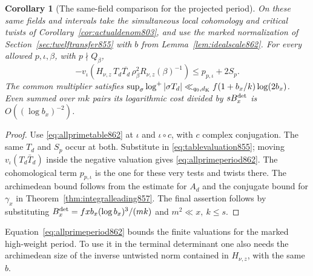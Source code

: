 \documentclass[a4paper,11pt]{article}
\newtheorem{corollary}[proposition]{Corollary}
\theoremstyle{definition}
\theoremstyle{remark}
\numberwithin{equation}{section}
\begin{document}
\begin{corollary}[The same-field comparison for the projected period]
\leavevmode\label{cor:allprimeperiod862}
On these same fields and intervals take the simultaneous local
cohomology and critical twists of Corollary~\ref{cor:actualdenom803},
and use the marked normalization of Section~\ref{sec:twelftransfer855}
with \(b\) from Lemma~\ref{lem:idealscale862}. For every
allowed \(p,\iota,\beta\), with \(p\nmid Q_\beta\),
\begin{equation}
  -v_\iota\!\left(H_{\nu,z}\,T_d\overline{T_d}\,
                    \rho_\beta^2 R_{\nu,z}(\beta)^{-1}\right)
                          \le p_{p,\iota}+2S_p .
 \label{eq:allprimeperiod862}
\end{equation}
The common multiplier satisfies
\(\sup_\sigma\log^+|\sigma T_d|
            \ll_{q_0,d_{\rm K}} f(1+b_x/k)\log(2b_x)\).
Even summed over \(mk\) pairs its logarithmic cost divided by
\(sB_x^{\rm det}\) is \(O((\log b_x)^{-2})\).
\end{corollary}
\begin{proof}
Use \eqref{eq:allprimetable862} at \(\iota\) and
\(\iota\circ c\), with \(c\) complex conjugation. The same
\(T_d\) and \(S_p\) occur at both. Substitute in
\eqref{eq:tablevaluation855}; moving \(v_\iota(T_d\bar T_d)\)
inside the negative valuation gives \eqref{eq:allprimeperiod862}.
The cohomological term \(p_{p,\iota}\) is the one for these
very tests and twists there. The archimedean bound follows
from the estimate for \(A_d\) and the conjugate bound for
\(\gamma_x\) in Theorem~\ref{thm:integralleading857}.
The final assertion follows by substituting
\(B_x^{\rm det}=fxb_x(\log b_x)^3/(mk)\) and
\(m^2\ll x,\ k\le s\).
\end{proof}

Equation~\eqref{eq:allprimeperiod862} bounds the finite valuations
for the marked high-weight period. To use it in the terminal
determinant one also needs the archimedean size of the inverse
untwisted norm contained in \(H_{\nu,z}\), with the same \(b\).
\clearpage
\end{document}
